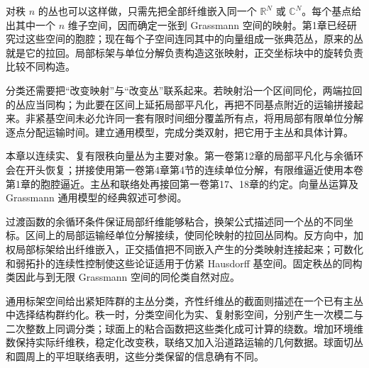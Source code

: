 \ProseParagraphBreak

对秩 \(n\) 的丛也可以这样做，只需先把全部纤维嵌入同一个 \(\mathbb R^N\) 或 \(\mathbb C^N\)。每个基点给出其中一个 \(n\) 维子空间，因而确定一张到 Grassmann 空间的映射。第1章已经研究过这些空间的胞腔；现在每个子空间连同其中的向量组成一张典范丛，原来的丛就是它的拉回。局部标架与单位分解负责构造这张映射，正交坐标块中的旋转负责比较不同构造。

\ProseParagraphBreak

分类还需要把“改变映射”与“改变丛”联系起来。若映射沿一个区间同伦，两端拉回的丛应当同构；为此要在区间上延拓局部平凡化，再把不同基点附近的运输拼接起来。非紧基空间未必允许同一套有限时间细分覆盖所有点，将用局部有限单位分解逐点分配运输时间。建立通用模型，完成分类双射，把它用于主丛和具体计算。

\ProseParagraphBreak

本章以连续实、复有限秩向量丛为主要对象。第一卷第12章的局部平凡化与余循环会在开头恢复；拼接使用第一卷第4章第4节的连续单位分解，有限维逼近使用本卷第1章的胞腔逼近。主丛和联络处再接回第一卷第17、18章的约定。向量丛运算及 Grassmann 通用模型的经典叙述可参阅\cite[第2节，Vector Bundles；第3节，Constructing New Vector Bundles Out of Old；第5节，Grassmann Manifolds and Universal Bundles]{MilnorStasheff1974}。






\begin{chaptersummary}
	过渡函数的余循环条件保证局部纤维能够粘合，换架公式描述同一个丛的不同坐标。区间上的局部运输经单位分解接续，使同伦映射的拉回丛同构。反方向中，加权局部标架给出纤维嵌入，正交插值把不同嵌入产生的分类映射连接起来；可数化和弱拓扑的连续性控制使这些论证适用于仿紧 Hausdorff 基空间。固定秩丛的同构类因此与到无限 Grassmann 空间的同伦类自然对应。

	\ProseParagraphBreak

	通用标架空间给出紧矩阵群的主丛分类，齐性纤维丛的截面则描述在一个已有主丛中选择结构群约化。秩一时，分类空间化为实、复射影空间，分别产生一次模二与二次整数上同调分类；球面上的粘合函数把这些类化成可计算的绕数。增加环境维数保持实际纤维秩，稳定化改变秩，联络又加入沿道路运输的几何数据。球面切丛和圆周上的平坦联络表明，这些分类保留的信息确有不同。
\end{chaptersummary}

\BookExercises

